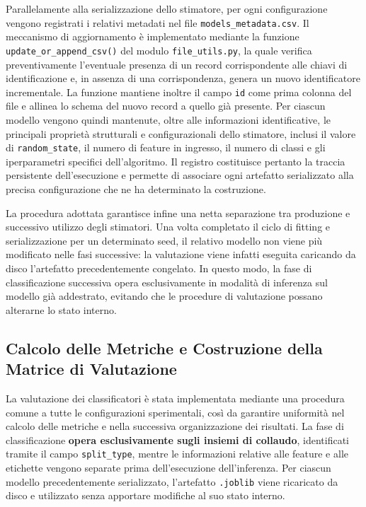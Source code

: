 Parallelamente alla serializzazione dello stimatore, per ogni configurazione vengono registrati i relativi metadati nel file \texttt{models\_metadata.csv}. 
Il meccanismo di aggiornamento è implementato mediante la funzione \texttt{update\_or\_append\_csv()} del modulo \texttt{file\_utils.py}, la quale verifica preventivamente l'eventuale presenza di un record corrispondente alle chiavi di identificazione e, in assenza di una corrispondenza, genera un nuovo identificatore incrementale. 
La funzione mantiene inoltre il campo \texttt{id} come prima colonna del file e allinea lo schema del nuovo record a quello già presente. 
Per ciascun modello vengono quindi mantenute, oltre alle informazioni identificative, le principali proprietà strutturali e configurazionali dello stimatore, inclusi il valore di \texttt{random\_state}, il numero di feature in ingresso, il numero di classi e gli iperparametri specifici dell'algoritmo. 
Il registro costituisce pertanto la traccia persistente dell'esecuzione e permette di associare ogni artefatto serializzato alla precisa configurazione che ne ha determinato la costruzione.

La procedura adottata garantisce infine una netta separazione tra produzione e successivo utilizzo degli stimatori. 
Una volta completato il ciclo di fitting e serializzazione per un determinato seed, il relativo modello non viene più modificato nelle fasi successive: la valutazione viene infatti eseguita caricando da disco l'artefatto precedentemente congelato. 
In questo modo, la fase di classificazione successiva opera esclusivamente in modalità di inferenza sul modello già addestrato, evitando che le procedure di valutazione possano alterarne lo stato interno.

\subsection{Calcolo delle Metriche e Costruzione della Matrice di Valutazione}
\label{subsec:calcolo_metriche_hk}

La valutazione dei classificatori è stata implementata mediante una procedura comune a tutte le configurazioni sperimentali, così da garantire uniformità nel calcolo delle metriche e nella successiva organizzazione dei risultati. La fase di classificazione \textbf{opera esclusivamente sugli insiemi di collaudo}, identificati tramite il campo \texttt{split\_type}, mentre le informazioni relative alle feature e alle etichette vengono separate prima dell'esecuzione dell'inferenza. 
Per ciascun modello precedentemente serializzato, l'artefatto \texttt{.joblib} viene ricaricato da disco e utilizzato senza apportare modifiche al suo stato interno.

